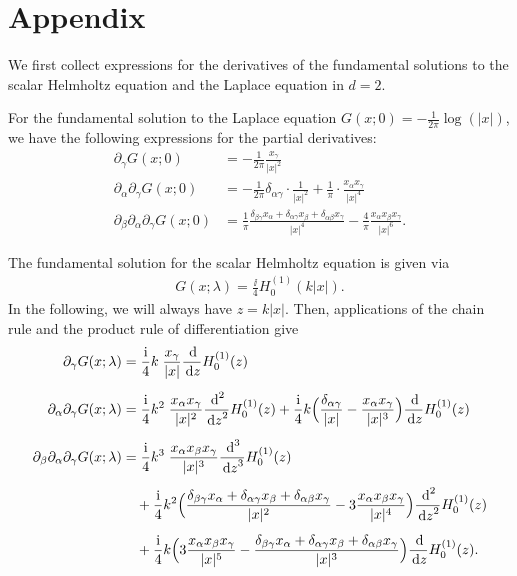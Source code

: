 \chapter*{Appendix}
\label{chap:app}
We first collect expressions for the derivatives of the fundamental solutions to the scalar Helmholtz equation and the Laplace equation in $d= 2$.

For the fundamental solution to the Laplace equation $G(x; 0) = -\frac{1}{2\pi} \log(|x|)$, we have the following expressions for the partial derivatives:
\begin{align*}
  \partial_\gamma G(x; 0) &= -\frac{1}{2\pi} \frac{x_\gamma}{|x|^2} \\[0.5em]
  \partial_\alpha \partial_\gamma G(x; 0) &= -\frac{1}{2\pi} \delta_{\alpha\gamma} \cdot \frac{1}{|x|^2} + \frac{1}{\pi} \cdot \frac{x_\alpha x_\gamma}{|x|^4} \\[0.5em]
  \partial_\beta \partial_\alpha \partial_\gamma G(x; 0)
  &= \frac{1}{\pi} \frac{\delta_{\beta \gamma} x_\alpha + \delta_{\alpha \gamma} x_\beta + \delta_{\alpha\beta} x_\gamma}{|x|^4} - \frac{4}{\pi} \frac{x_\alpha x_\beta x_\gamma}{|x|^6}.
\end{align*}

The fundamental solution  for the scalar Helmholtz equation is given via 
\begin{align*}
  G(x; \lambda) = \frac{\ii}{4} H_0^{(1)}(k|x|).
\end{align*}
In the following, we will always have $z =  k|x|$.  
Then, applications of the chain rule and the product rule of differentiation give
\begin{align*}
  \partial_\gamma G(x; \lambda) &= \frac{\ii}{4} k\;  \frac{x_\gamma}{|x|} \frac{\d{}}{\d z} H_0^{(1)}(z) \\[0.5em]
  \partial_\alpha \partial_\gamma G(x; \lambda) 
  &= \frac{\ii}{4} k^2 \;  \frac{x_\alpha x_\gamma}{|x|^2} \frac{\d{}^2}{\d z^2} H_0^{(1)}(z) + \frac{\ii}{4} k \Big(\frac{\delta_{\alpha\gamma}}{|x|} - \frac{x_\alpha x_\gamma}{|x|^3} \Big) \frac{\d{}}{\d z} H_0^{(1)}(z) \\[0.5em]
  \partial_\beta \partial_\alpha \partial_\gamma G(x; \lambda)
  &= \frac{\ii}{4} k^3 \; \frac{x_\alpha x_\beta x_\gamma}{|x|^3} \frac{\d{}^3}{\d z^3} H_0^{(1)}(z) \\[0.5em]
  &\quad + \frac{\ii}{4} k^2 \Big(\frac{\delta_{\beta\gamma} x_\alpha + \delta_{\alpha \gamma} x_\beta + \delta_{\alpha \beta} x_\gamma}{|x|^2} - 3 \frac{x_\alpha x_\beta x_\gamma}{|x|^4} \Big) \frac{\d{}^2}{\d z^2} H_0^{(1)}(z) \\[0.5em]
  &\quad + \frac{\ii}{4} k \Big( 3 \frac{x_\alpha x_\beta x_\gamma}{|x|^5} - \frac{\delta_{\beta\gamma} x_\alpha + \delta_{\alpha\gamma} x_\beta + \delta_{\alpha\beta} x_\gamma}{|x|^3} \Big) \frac{\d{}}{\d z} H_0^{(1)}(z).
\end{align*}

